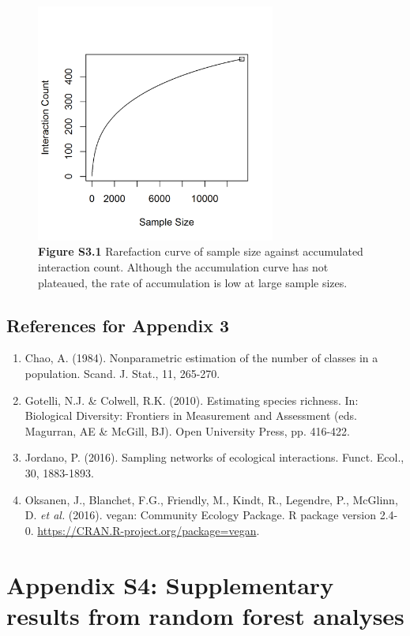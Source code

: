 \documentclass[11pt]{article}
\begin{document}
\begin{figure}[H]
\centering\includegraphics[width=0.7\textwidth]{../Figures/Rarefaction.png} 
\caption[]{\textbf{Figure S3.1} Rarefaction curve of sample size against accumulated interaction count. Although the accumulation curve has not plateaued, the rate of accumulation is low at large sample sizes.  }
\end{figure}

\subsection*{References for Appendix 3}

\begin{enumerate}
\item Chao, A. (1984). Nonparametric estimation of the number of classes in a population. Scand. J. Stat., 11, 265-270.
\item Gotelli, N.J. \& Colwell, R.K. (2010). Estimating species richness. In: Biological Diversity: Frontiers in Measurement and Assessment (eds. Magurran, AE \& McGill, BJ). Open University Press, pp. 416-422.
\item Jordano, P. (2016). Sampling networks of ecological interactions. Funct. Ecol., 30, 1883-1893.
\item Oksanen, J., Blanchet, F.G., Friendly, M., Kindt, R., Legendre, P., McGlinn, D. \emph{et al. }(2016). vegan: Community Ecology Package. R package version 2.4-0.  \url{https://CRAN.R-project.org/package=vegan}. 
\end{enumerate}

\section{Appendix S4: Supplementary results from random forest analyses}
\end{document}
